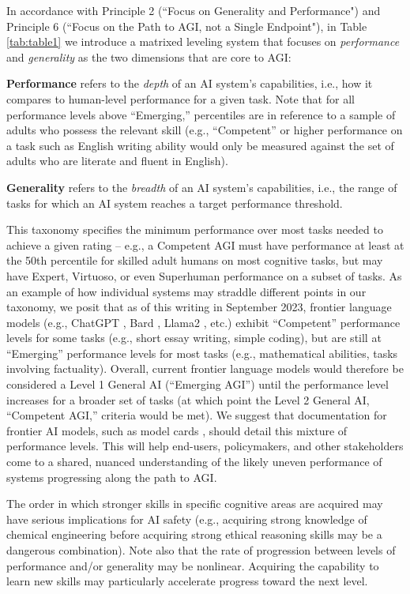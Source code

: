 \documentclass{article}
\theoremstyle{plain}
\theoremstyle{definition}
\theoremstyle{remark}
\begin{document}
In accordance with Principle 2 (``Focus on Generality and Performance") and Principle 6 (``Focus on the Path to AGI, not a Single Endpoint"), in Table \ref{tab:table1} we introduce a matrixed leveling system that focuses on \textit{performance} and \textit{generality} as the two dimensions that are core to AGI:

\textbf{Performance} refers to the \textit{depth} of an AI system’s capabilities, i.e., how it compares to human-level performance for a given task. Note that for all performance levels above “Emerging,” percentiles are in reference to a sample of adults who possess the relevant skill (e.g., “Competent” or higher performance on a task such as English writing ability would only be measured against the set of adults who are literate and fluent in English). 

\textbf{Generality} refers to the \textit{breadth} of an AI system’s capabilities, i.e., the range of tasks for which an AI system reaches a target performance threshold.

This taxonomy specifies the minimum performance over most tasks needed to achieve a given rating – e.g., a Competent AGI must have performance at least at the 50th percentile for skilled adult humans on most cognitive tasks, but may have Expert, Virtuoso, or even Superhuman performance on a subset of tasks. As an example of how individual systems may straddle different points in our taxonomy, we posit that as of this writing in September 2023, frontier language models (e.g., ChatGPT \citep{openai2023gpt4}, Bard \citep{anil2023palm}, Llama2 \citep{touvron2023llama}, etc.) exhibit “Competent” performance levels for some tasks (e.g., short essay writing, simple coding), but are still at “Emerging” performance levels for most tasks (e.g., mathematical abilities, tasks involving factuality). Overall, current frontier language models would therefore be considered a Level 1 General AI (“Emerging AGI”) until the performance level increases for a broader set of tasks (at which point the Level 2 General AI, “Competent AGI,” criteria would be met). We suggest that documentation for frontier AI models, such as model cards \citep{Mitchell_2019}, should detail this mixture of performance levels. This will help end-users, policymakers, and other stakeholders come to a shared, nuanced understanding of the likely uneven performance of systems progressing along the path to AGI.

The order in which stronger skills in specific cognitive areas are acquired may have serious implications for AI safety (e.g., acquiring strong knowledge of chemical engineering before acquiring strong ethical reasoning skills may be a dangerous combination). Note also that the rate of progression between levels of performance and/or generality may be nonlinear. Acquiring the capability to learn new skills may particularly accelerate progress toward the next level.
\end{document}
